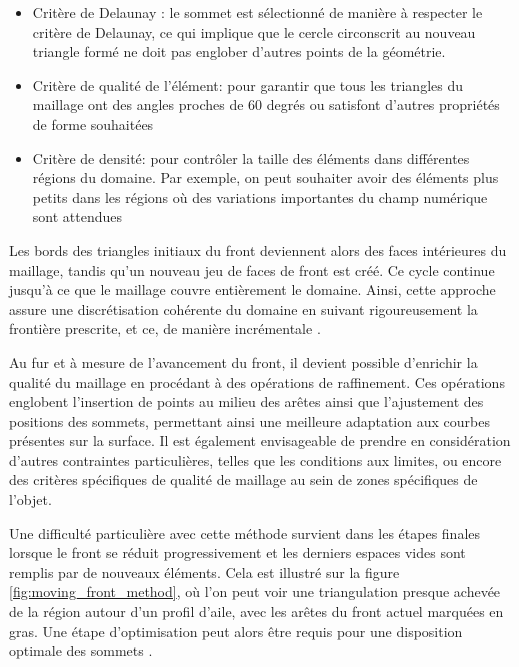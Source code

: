\begin{itemize}
    \item Critère de Delaunay : le sommet est sélectionné de manière à respecter le critère de Delaunay, ce qui implique que le cercle circonscrit au nouveau triangle formé ne doit pas englober d'autres points de la géométrie.\\
    \item Critère de qualité de l'élément: pour garantir que tous les triangles du maillage ont des angles proches de 60 degrés ou satisfont d'autres propriétés de forme souhaitées\\
    \item Critère de densité: pour contrôler la taille des éléments dans différentes régions du domaine. Par exemple, on peut souhaiter avoir des éléments plus petits dans les régions où des variations importantes du champ numérique sont attendues\\
\end{itemize}


Les bords des triangles initiaux du front deviennent alors des faces intérieures du maillage, tandis qu'un nouveau jeu de faces de front est créé. Ce cycle continue jusqu'à ce que le maillage couvre entièrement le domaine. Ainsi, cette approche assure une discrétisation cohérente du domaine en suivant rigoureusement la frontière prescrite, et ce, de manière incrémentale \cite{baker2005mesh}.

Au fur et à mesure de l'avancement du front, il devient possible d'enrichir la qualité du maillage en procédant à des opérations de raffinement. Ces opérations englobent l'insertion de points au milieu des arêtes ainsi que l'ajustement des positions des sommets, permettant ainsi une meilleure adaptation aux courbes présentes sur la surface. Il est également envisageable de prendre en considération d'autres contraintes particulières, telles que les conditions aux limites, ou encore des critères spécifiques de qualité de maillage au sein de zones spécifiques de l'objet.

Une difficulté particulière avec cette méthode survient dans les étapes finales lorsque le front se réduit progressivement et les derniers espaces vides sont remplis par de nouveaux éléments. Cela est illustré sur la figure \ref{fig:moving_front_method}, où l'on peut voir une triangulation presque achevée de la région autour d'un profil d'aile, avec les arêtes du front actuel marquées en gras.  Une étape d'optimisation peut alors être requis pour une disposition optimale des sommets \cite{botella2016generation}.

